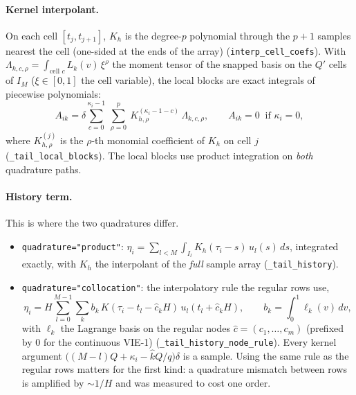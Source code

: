 \documentclass[10pt,a4paper]{article}
\newcommand{\code}[1]{\texttt{\small #1}}
\newcommand{\Qp}{Q'}
\begin{document}
\paragraph{Kernel interpolant.} On each cell $[t_j,t_{j+1}]$, $K_h$ is the degree-$p$ polynomial
through the $p+1$ samples nearest the cell (one-sided at the ends of the array)
(\code{interp\_cell\_coefs}). With $\Lambda_{k,c,\rho} = \int_{\text{cell }c} L_k(v)\,\xi^\rho$
the moment tensor of the snapped basis on the $\Qp$ cells of $I_M$ ($\xi\in[0,1]$ the cell variable),
the local blocks are exact integrals of piecewise polynomials:
\[
  A_{ik} = \delta \sum_{c=0}^{\kappa_i-1}\ \sum_{\rho=0}^{p}\ K_{h,\rho}^{(\kappa_i-1-c)}\,\Lambda_{k,c,\rho},
  \qquad A_{ik} = 0 \ \text{ if } \kappa_i = 0 ,
\]
where $K_{h,\rho}^{(j)}$ is the $\rho$-th monomial coefficient of $K_h$ on cell $j$ (\code{\_tail\_local\_blocks}).
The local blocks use product integration on \emph{both} quadrature paths.

\paragraph{History term.} This is where the two quadratures differ.
\begin{itemize}\setlength\itemsep{2pt}
\item \code{quadrature="product"}: $\eta_i = \sum_{l<M}\int_{I_l} K_h(\tau_i-s)\,u_l(s)\,ds$, integrated exactly,
with $K_h$ the interpolant of the \emph{full} sample array (\code{\_tail\_history}).
\item \code{quadrature="collocation"}: the interpolatory rule the regular rows use,
\[
  \eta_i = H\sum_{l=0}^{M-1}\sum_{k} b_k\,K(\tau_i - t_l - \hat c_k H)\,u_l(t_l + \hat c_k H),
  \qquad b_k = \int_0^1 \ell_k(v)\,dv ,
\]
with $\ell_k$ the Lagrange basis on the regular nodes $\hat c = (c_1,\dots,c_m)$
(prefixed by $0$ for the continuous VIE-1) (\code{\_tail\_history\_node\_rule}).
Every kernel argument $\big((M-l)Q + \kappa_i - \hat k Q/q\big)\delta$ is a sample.
Using the same rule as the regular rows matters for the first kind: a quadrature mismatch
between rows is amplified by $\sim\!1/H$ and was measured to cost one order.
\end{itemize}
\end{document}
